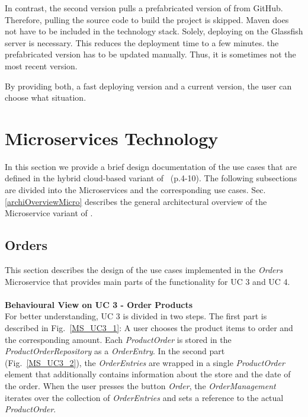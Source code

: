 In contrast, the second version pulls a prefabricated version of \CoCoME from GitHub. 
Therefore, pulling the source code to build the project is skipped. 
Maven does not have to be included in the technology stack. Solely, deploying \CoCoME on the Glassfish server is necessary.
This reduces the deployment time to a few minutes.
 the prefabricated version has to be updated manually. 
Thus, it is sometimes not the most recent version.

By providing both, a fast deploying version and a current version, the user can choose what situation.
	

	

	
\section{Microservices Technology} \label{MS}
	In this section we provide a brief design documentation of the use cases that are defined in the hybrid cloud-based variant of \CoCoME~\cite{herold2008}(p.4-10).
	The following subsections are divided into the Microservices and the corresponding use cases. Sec.\ref{archiOverviewMicro} describes the general architectural overview of the Microservice variant of \CoCoME.
	

	

	\FloatBarrier
		\subsection{Orders}
		This section describes the design of the use cases implemented in the \textit{Orders} Microservice that provides main parts of the functionality for UC 3 and UC 4.\\
		\noindent
		\\
		\textbf{Behavioural View on UC 3 - Order Products} \\
		For better understanding, UC 3 is divided in two steps. The first part is described in Fig.~\ref{MS_UC3_1}: A user chooses the product items to order and the corresponding amount. Each \textit{ProductOrder} is stored in the \textit{ProductOrderRepository} as a \textit{OrderEntry}. In the second part (Fig.~\ref{MS_UC3_2}), the  \textit{OrderEntries} are wrapped in a single \textit{ProductOrder} element that additionally contains information about the store and the date of the order. When the user presses the button \textit{Order}, the \textit{OrderManagement} iterates over the collection of \textit{OrderEntries} and sets a reference to the actual \textit{ProductOrder}.
	

